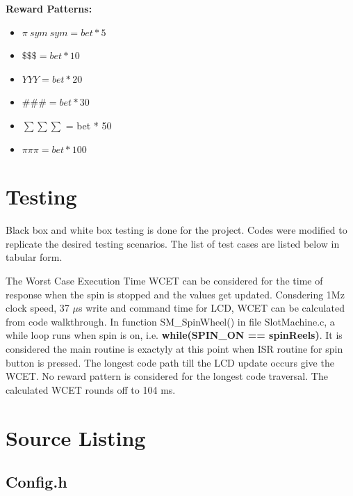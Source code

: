 \documentclass[a4paper,13pt,sffamily,margin=20mm]{memoir}
\let\stdsection\section
\renewcommand\section{\newpage\stdsection}
\begin{document}
\large \textbf {Reward Patterns:}

\begin{itemize}
\item \normalsize \( \pi\ sym\ sym = bet * 5 \)   
\item \( \$ \$ \$ = bet * 10 \)  
\item \( Y Y Y = bet * 20  \)
\item \( \# \# \# = bet * 30 \) 
\item \tiny \( \sum \sum \sum\) \normalsize = bet * 50
\item \normalsize \( \pi \pi \pi = bet * 100 \)   
\end{itemize}
 




\chapter {Testing}
Black box and white box testing is done for the project. Codes were modified to replicate the desired testing scenarios. The list of test cases are listed below in tabular form.



The Worst Case Execution Time WCET can be considered for the time of response when the spin is stopped and the values get updated. Consdering 1Mz clock speed, 37 \(\mu\)s write and command time for LCD, WCET can be calculated from code walkthrough. In function SM\_SpinWheel() in file SlotMachine.c, a while loop runs when spin is on, i.e. \textbf{while(SPIN\_ON == spinReels)}. It is considered the main routine is exactyly at this point when ISR routine for spin button is pressed. The longest code path till the LCD update occurs give the WCET. No reward pattern is considered for the longest code traversal. The calculated WCET rounds off to 104 ms.


\chapter {Source Listing}



\section{Config.h}
\begin{small}

\end{small}
\end{document}

